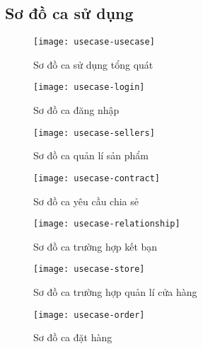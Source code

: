 \subsection{Sơ đồ ca sử dụng}

\begin{figure}[hbt!]\fontsize{13px}{13px}\selectfont
	\centering
	\texttt{[image: usecase-usecase]}
	\caption{Sơ đồ ca sử dụng tổng quát}
\end{figure}
\clearpage
\begin{figure}[hbt!]\fontsize{13px}{13px}\selectfont
	\begin{center}	
		\texttt{[image: usecase-login]}
		\caption{Sơ đồ ca đăng nhập}
	\end{center}
\end{figure}


\begin{figure}[hbt!]\fontsize{13px}{13px}\selectfont
	\begin{center}	
		\texttt{[image: usecase-sellers]}
		\caption{Sơ đồ ca quản lí sản phẩm}
	\end{center}
\end{figure}


\begin{figure}[hbt!]\fontsize{13px}{13px}\selectfont
	\begin{center}	
		\texttt{[image: usecase-contract]}
		\caption{Sơ đồ ca yêu cầu chia sẻ}
	\end{center}
\end{figure}


\begin{figure}[hbt!]\fontsize{13px}{13px}\selectfont
	\begin{center}	
		\texttt{[image: usecase-relationship]}
		\caption{Sơ đồ ca trường hợp kết bạn}
	\end{center}
\end{figure}



\begin{figure}[hbt!]\fontsize{13px}{13px}\selectfont
	\begin{center}	
		\texttt{[image: usecase-store]}
		\caption{Sơ đồ ca trường hợp quản lí cửa hàng}
	\end{center}
\end{figure}

\begin{figure}[hbt!]\fontsize{13px}{13px}\selectfont
	\begin{center}	
		\texttt{[image: usecase-order]}
		\caption{Sơ đồ ca đặt hàng}
	\end{center}
\end{figure}

